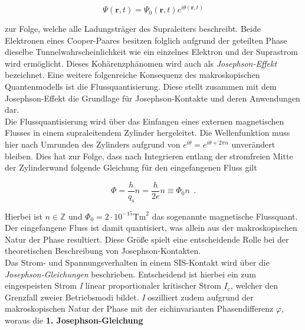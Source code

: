 \begin{equation}
\Psi(\textbf{r},t) = \Psi_0(\textbf{r},t)e^{i\theta(\textbf{r},t)}
\end{equation}

zur Folge, welche alle Ladungsträger des Supraleiters beschreibt. Beide Elektronen eines Cooper-Paares besitzen folglich aufgrund der geteilten Phase dieselbe Tunnelwahrscheinlichkeit wie ein einzelnes Elektron und der Suprastrom wird ermöglicht. 
Dieses Kohärenzphänomen wird auch als \textit{Josephson-Effekt} bezeichnet.
Eine weitere folgenreiche Konsequenz des makroskopischen Quantenmodells ist die Flussquantisierung. Diese stellt zusammen  mit dem Josephson-Effekt die Grundlage für Josephson-Kontakte und deren Anwendungen dar. \\ 

Die Flussquantisierung wird über das Einfangen eines externen magnetischen Flusses in einem supraleitendem Zylinder hergeleitet. Die Wellenfunktion muss hier nach Umrunden des Zylinders aufgrund von $e^{i\theta}=e^{i\theta + 2\pi n}$ unverändert bleiben. Dies hat zur Folge, dass nach Integrieren entlang der stromfreien Mitte der Zylinderwand folgende Gleichung für den eingefangenen Fluss gilt

\begin{equation}
\Phi = \frac{h}{q_\mathrm{s}}n = \frac{h}{2e}n \equiv \Phi_0n \ \ .
\end{equation}

Hierbei ist $n\in\mathbb{Z}$ und $\Phi_0 = 2\cdot 10^{-15} \text{Tm}^2$ das sogenannte magnetische Flussquant. Der eingefangene Fluss ist damit quantisiert, was allein aus der makroskopischen Natur der Phase resultiert. Diese Größe spielt eine entscheidende Rolle bei der theoretischen Beschreibung von Josephson-Kontakten. \\

Das Strom- und Spannungsverhalten in einem SIS-Kontakt wird über die \textit{Josephson-Gleichungen} beschrieben. Entscheidend ist hierbei ein zum eingespeisten Strom \textit{I} linear proportionaler kritischer Strom \textit{$I_\mathrm{c}$}, welcher den Grenzfall zweier Betriebsmodi bildet. \textit{I} oszilliert zudem aufgrund der makroskopischen Natur der Phase mit der eichinvarianten Phasendifferenz $\varphi$, woraus die \textbf{1. Josephson-Gleichung}



